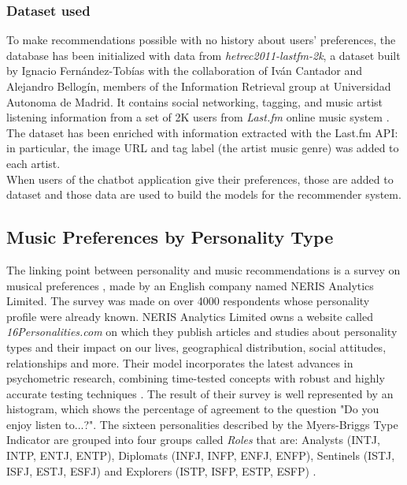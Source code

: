 \documentclass[b5paper,10pt,twoside,cucitura]{toptesi}
\begin{document}
\subsubsection{Dataset used}

 
To make recommendations possible with no history about users' preferences, the database has been initialized with data from \textit{hetrec2011-lastfm-2k}, a dataset built by Ignacio Fern{\'a}ndez-Tob{\'i}as with the collaboration of Iv{\'a}n Cantador and Alejandro Bellog{\'i}n, members of the Information Retrieval group at Universidad Autonoma de Madrid. It contains social networking, tagging, and music artist listening information from a set of 2K users from \textit{Last.fm} online music system   \citep{lastfm}. The dataset has been enriched with information extracted with the Last.fm API: in particular, the image URL and tag label (the artist music genre) was added to each artist.
\\
When users of the chatbot application give their preferences, those are added to dataset and those data are used to build the models for the recommender system.

\subsection{Music Preferences by Personality Type}

The linking point between personality and music recommendations is a survey on musical preferences   \citep{survey}, made by an English company named NERIS Analytics Limited. The survey was made on over 4000 respondents whose personality profile were already known. 
NERIS Analytics Limited owns a website called \textit{16Personalities.com} on which they publish articles and studies about personality types and their impact on our lives, geographical distribution, social attitudes, relationships and more. Their model incorporates the latest advances in psychometric research, combining time-tested concepts with robust and highly accurate testing techniques   \citep{16personalities}. The result of their survey is well represented by an histogram, which shows the percentage of agreement to the question "Do you enjoy listen to...?". The sixteen personalities described by the Myers-Briggs Type Indicator are grouped into four groups called \textit{Roles} that are: Analysts (INTJ, INTP, ENTJ, ENTP), Diplomats (INFJ, INFP, ENFJ, ENFP), Sentinels (ISTJ, ISFJ, ESTJ, ESFJ) and Explorers (ISTP, ISFP, ESTP, ESFP)   \citep{perstypes}.
\end{document}
